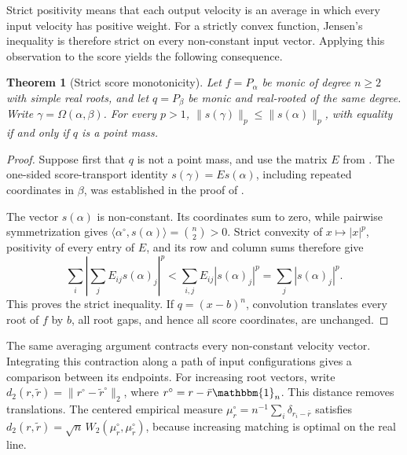 \documentclass[12pt,reqno]{amsart}
\newtheorem{theorem}{Theorem}[section]
\theoremstyle{definition}
\theoremstyle{remark}
\newcommand{\one}{\mathbbm{1}_n}
\begin{document}
Strict positivity means that each output velocity is an average in which every input velocity has positive weight. For a strictly convex function, Jensen’s inequality is therefore strict on every non-constant input vector. Applying this observation to the score yields the following consequence.

\begin{theorem}[Strict score monotonicity]
\label{thm:strict-score-monotonicity}
Let \(f=P_\alpha\) be monic of degree \(n\geq2\) with simple real roots,
and let \(q=P_\beta\) be monic and real-rooted of the same degree.
Write \(\gamma=\Omega(\alpha,\beta)\).  For every \(p>1\),
\(\|s(\gamma)\|_p\leq\|s(\alpha)\|_p\), with equality if and only if
\(q\) is a point mass.
\end{theorem}

\begin{proof}
Suppose first that \(q\) is not a point mass, and use the matrix \(E\)
from .  The one-sided score-transport
identity \(s(\gamma)=Es(\alpha)\), including repeated coordinates in
\(\beta\), was established in the proof of .

The vector \(s(\alpha)\) is non-constant.  Its coordinates sum to zero,
while pairwise symmetrization gives
\(\langle\alpha^\circ,s(\alpha)\rangle=\binom n2>0\).
Strict convexity of \(x\mapsto|x|^p\), positivity of every entry of
\(E\), and its row and column sums therefore give
\begin{equation}\label{eq:strict-score-jensen}
 \sum_i\left|\sum_j E_{ij}s(\alpha)_j\right|^p
 <\sum_{i,j}E_{ij}|s(\alpha)_j|^p
 =\sum_j|s(\alpha)_j|^p.
\end{equation}
This proves the strict inequality.  If \(q=(x-b)^n\), convolution translates every root of \(f\) by \(b\), all root gaps, and hence all score coordinates, are unchanged.
\end{proof}

The same averaging argument contracts every non-constant velocity vector. Integrating this contraction along a path of input configurations gives a comparison between its endpoints. For increasing root vectors, write
\(d_2(r,\widetilde r)=\|r^\circ-\widetilde r^\circ\|_2\), where
\(r^\circ=r-\bar r\one\).  This distance removes translations.
The centered empirical measure
\(\mu_r^\circ=n^{-1}\sum_i\delta_{r_i-\bar r}\) satisfies
\(d_2(r,\widetilde r)=\sqrt n\,W_2(\mu_r^\circ,\mu_{\widetilde r}^\circ)\),
because increasing matching is optimal on the real line.
\end{document}
